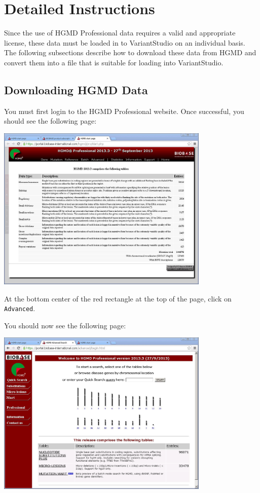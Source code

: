 \documentclass[11pt,titlepage,a4paper]{article}
\begin{document}
\section{Detailed Instructions}

Since the use of HGMD Professional data requires a valid and appropriate license, these data must be loaded in to VariantStudio on an individual basis. The following subsections describe how to download these data from HGMD and convert them into a file that is suitable for loading into VariantStudio.

\subsection{Downloading HGMD Data}

You must first login to the HGMD Professional website. Once successful, you should see the following page:
\begin{center}
\includegraphics[width=4in]{hgmdmain.JPG}
\end{center}

   At the bottom center of the red rectangle at the top of the page, click on \texttt{Advanced}.
   
You should now see the following page:

\begin{center}
\includegraphics[width=4in]{advanced.JPG}
\end{center}
\end{document}
